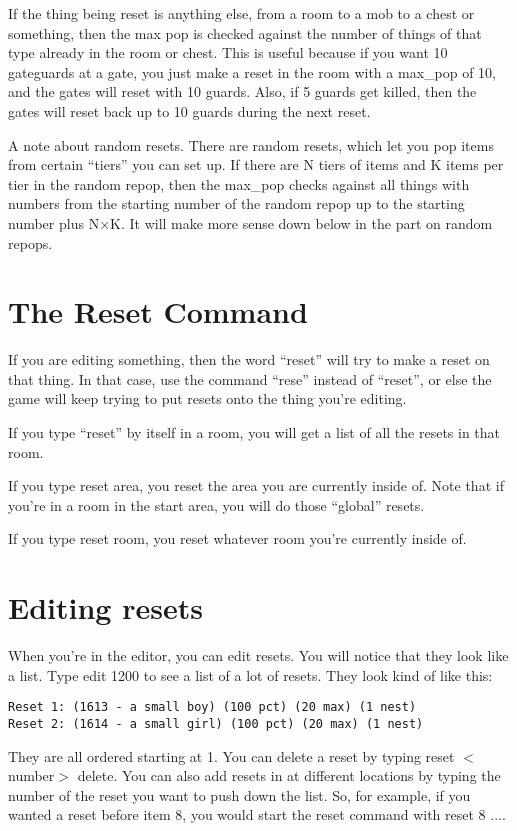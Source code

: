 If the thing being reset is anything else, from a room to a mob
to a chest or something, then the max pop is checked against the
number of things of that type already in the room or chest. This
is useful because if you want 10 gateguards at a gate, you just
make a reset in the room with a max\_pop of 10, and the gates
will reset with 10 guards. Also, if 5 guards get killed, then the
gates will reset back up to 10 guards during the next reset.

A note about random resets. There are random resets, which let you
pop items from certain ``tiers'' you can set up. If there are 
N tiers of items and K items per tier in the random repop, then
the max\_pop checks against all things with numbers from the
starting number of the random repop up to the starting number plus
N$\times$K. It will make more sense down below in the part on random
repops. 

\section{The Reset Command}

If you are editing something, then the word ``reset'' will try to
make a reset on that thing. In that case, use the command ``rese''
instead of ``reset'', or else the game will keep trying to put
resets onto the thing you're editing.

If you type ``reset'' by itself in a room, you will get a list
of all the resets in that room. 

If you type reset area, you reset the area you are currently
inside of. Note that if you're in a room in the start area, you
will do those ``global'' resets.


If you type reset room, you reset whatever room you're currently 
inside of.

\section{Editing resets}

When you're in the editor, you can edit resets. You will notice
that they look like a list. Type edit 1200 to see a list of a 
lot of resets. They look kind of like this:

\begin{verbatim}
Reset 1: (1613 - a small boy) (100 pct) (20 max) (1 nest)
Reset 2: (1614 - a small girl) (100 pct) (20 max) (1 nest)
\end{verbatim}

They are all ordered starting at 1. You can delete a reset by typing
reset $<$number$>$ delete. You can also add resets in at different
locations by typing the number of the reset you want to push down
the list. So, for example, if you wanted a reset before item 8,
you would start the reset command with reset 8 ....

